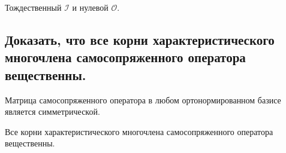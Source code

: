 \begin{example}
    Тождественный $\mathscr{I}$ и нулевой $\mathscr{O}$.
\end{example}


\newpage


\subsection{
    Доказать, что все корни характеристического многочлена самосопряженного оператора вещественны.
}

\begin{theorem}
    Матрица самосопряженного оператора в любом ортонормированном базисе является симметрической.
\end{theorem}

\begin{theorem}
    Все корни характеристического многочлена самосопряженного оператора вещественны.
\end{theorem}

